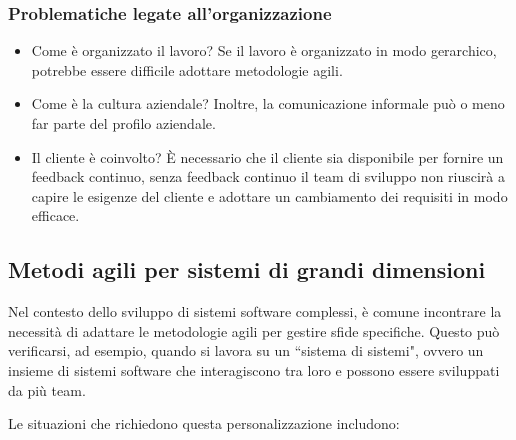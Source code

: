 \subsubsection{Problematiche legate all'organizzazione}
\begin{itemize}
    \item Come è organizzato il lavoro? Se il lavoro è organizzato in modo
    gerarchico, potrebbe essere difficile adottare metodologie agili. 
    \item Come è la cultura aziendale? Inoltre,
    la comunicazione informale può o meno far parte del profilo aziendale.
    \item Il cliente è coinvolto? È necessario che il cliente sia disponibile 
    per fornire un feedback continuo, senza feedback continuo il team di sviluppo
    non riuscirà a capire le esigenze del cliente e adottare un cambiamento 
    dei requisiti in modo efficace.
\end{itemize}
\subsection{Metodi agili per sistemi di grandi dimensioni}
Nel contesto dello sviluppo di sistemi software complessi, è comune
incontrare la necessità di adattare le metodologie agili per gestire sfide specifiche.
Questo può verificarsi, ad esempio, quando si lavora su un ``sistema di sistemi", ovvero
un insieme di sistemi software che interagiscono tra loro e possono essere sviluppati da
più team.

Le situazioni che richiedono questa personalizzazione includono:

